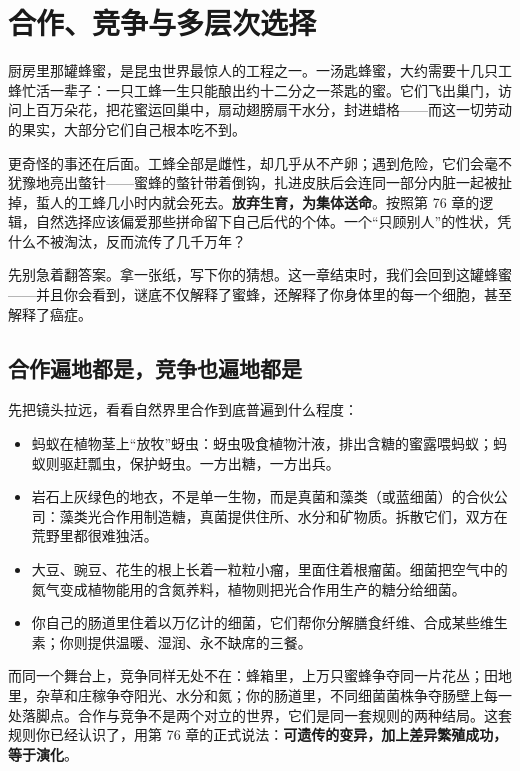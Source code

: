 \chapter{合作、竞争与多层次选择}

\begin{kaichang}
厨房里那罐蜂蜜，是昆虫世界最惊人的工程之一。一汤匙蜂蜜，大约需要十几只工蜂忙活一辈子：一只工蜂一生只能酿出约十二分之一茶匙的蜜。它们飞出巢门，访问上百万朵花，把花蜜运回巢中，扇动翅膀扇干水分，封进蜡格——而这一切劳动的果实，大部分它们自己根本吃不到。

更奇怪的事还在后面。工蜂全部是雌性，却几乎从不产卵；遇到危险，它们会毫不犹豫地亮出螫针——蜜蜂的螫针带着倒钩，扎进皮肤后会连同一部分内脏一起被扯掉，蜇人的工蜂几小时内就会死去。\textbf{放弃生育，为集体送命}。按照第 76 章的逻辑，自然选择应该偏爱那些拼命留下自己后代的个体。一个“只顾别人”的性状，凭什么不被淘汰，反而流传了几千万年？

先别急着翻答案。拿一张纸，写下你的猜想。这一章结束时，我们会回到这罐蜂蜜——并且你会看到，谜底不仅解释了蜜蜂，还解释了你身体里的每一个细胞，甚至解释了癌症。
\end{kaichang}

\section{合作遍地都是，竞争也遍地都是}

先把镜头拉远，看看自然界里合作到底普遍到什么程度：

\begin{itemize}[itemsep=2pt]
\item 蚂蚁在植物茎上“放牧”蚜虫：蚜虫吸食植物汁液，排出含糖的蜜露喂蚂蚁；蚂蚁则驱赶瓢虫，保护蚜虫。一方出糖，一方出兵。
\item 岩石上灰绿色的地衣，不是单一生物，而是真菌和藻类（或蓝细菌）的合伙公司：藻类光合作用制造糖，真菌提供住所、水分和矿物质。拆散它们，双方在荒野里都很难独活。
\item 大豆、豌豆、花生的根上长着一粒粒小瘤，里面住着根瘤菌。细菌把空气中的氮气变成植物能用的含氮养料，植物则把光合作用生产的糖分给细菌。
\item 你自己的肠道里住着以万亿计的细菌，它们帮你分解膳食纤维、合成某些维生素；你则提供温暖、湿润、永不缺席的三餐。
\end{itemize}

而同一个舞台上，竞争同样无处不在：蜂箱里，上万只蜜蜂争夺同一片花丛；田地里，杂草和庄稼争夺阳光、水分和氮；你的肠道里，不同细菌菌株争夺肠壁上每一处落脚点。合作与竞争不是两个对立的世界，它们是同一套规则的两种结局。这套规则你已经认识了，用第 76 章的正式说法：\textbf{可遗传的变异，加上差异繁殖成功，等于演化}。

